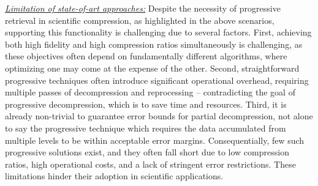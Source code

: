 \textit{\underline{Limitation of state-of-art approaches:}}
Despite the necessity of progressive retrieval in scientific compression, as highlighted in the above scenarios, supporting this functionality is challenging due to several factors. 
First, achieving both high fidelity and high compression ratios simultaneously is challenging, as these objectives often depend on fundamentally different algorithms, where optimizing one may come at the expense of the other.
Second, straightforward progressive techniques often introduce significant operational overhead, requiring multiple passes of decompression and reprocessing -- contradicting the goal of progressive decompression, which is to save time and resources.
Third, it is already non-trivial to guarantee error bounds for partial decompression, not alone to say the progressive technique which requires the data accumulated from multiple levels to be within acceptable error margins.
Consequentially, few such progressive solutions exist, and they often fall short due to low compression ratios, high operational costs, and a lack of stringent error restrictions. These limitations hinder their adoption in scientific applications.


